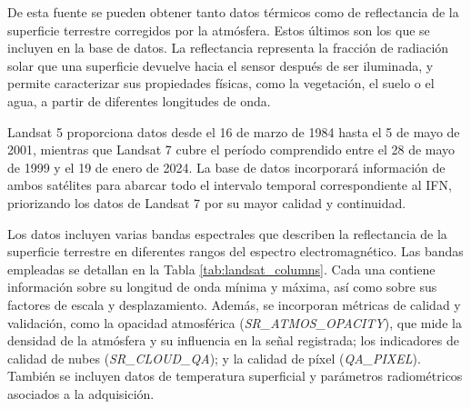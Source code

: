 De esta fuente se pueden obtener tanto datos térmicos como de reflectancia de la superficie terrestre corregidos por la atmósfera. Estos últimos son los que se incluyen en la base de datos. La reflectancia representa la fracción de radiación solar que una superficie devuelve hacia el sensor después de ser iluminada, y permite caracterizar sus propiedades físicas, como la vegetación, el suelo o el agua, a partir de diferentes longitudes de onda.

\medskip

Landsat 5 \cite{landsat5_data} proporciona datos desde el 16 de marzo de 1984 hasta el 5 de mayo de 2001, mientras que Landsat 7 \cite{landsat7_data} cubre el período comprendido entre el 28 de mayo de 1999 y el 19 de enero de 2024. La base de datos incorporará información de ambos satélites para abarcar todo el intervalo temporal correspondiente al IFN, priorizando los datos de Landsat 7 por su mayor calidad y continuidad.

\medskip

Los datos incluyen varias bandas espectrales que describen la reflectancia de la superficie terrestre en diferentes rangos del espectro electromagnético. Las bandas empleadas se detallan en la Tabla \ref{tab:landsat_columns}. Cada una contiene información sobre su longitud de onda mínima y máxima, así como sobre sus factores de escala y desplazamiento. Además, se incorporan métricas de calidad y validación, como la opacidad atmosférica (\textit{SR\_ATMOS\_OPACITY}), que mide la densidad de la atmósfera y su influencia en la señal registrada; los indicadores de calidad de nubes (\textit{SR\_CLOUD\_QA}); y la calidad de píxel (\textit{QA\_PIXEL}). También se incluyen datos de temperatura superficial y parámetros radiométricos asociados a la adquisición.

